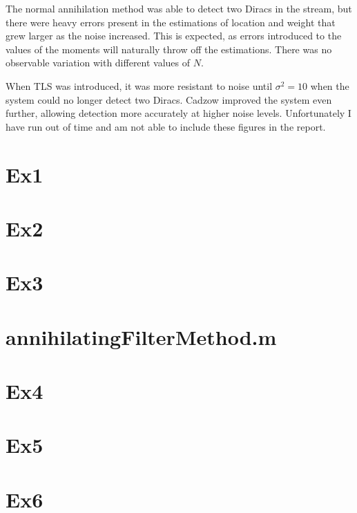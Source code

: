\documentclass[a4paper]{article}
\begin{document}
The normal annihilation method was able to detect two Diracs in the stream, but there were heavy errors present in the estimations of location and weight that grew larger as the noise increased. This is expected, as errors introduced to the values of the moments will naturally throw off the estimations. There was no observable variation with different values of $N$.

When TLS was introduced, it was more resistant to noise until $\sigma^2 = 10$ when the system could no longer detect two Diracs. Cadzow improved the system even further, allowing detection more accurately at higher noise levels. Unfortunately I have run out of time and am not able to include these figures in the report.

\appendix
\section{Ex1}


\section{Ex2}


\section{Ex3}


\section{annihilatingFilterMethod.m}


\section{Ex4}


\section{Ex5}


\section{Ex6}

\end{document}
